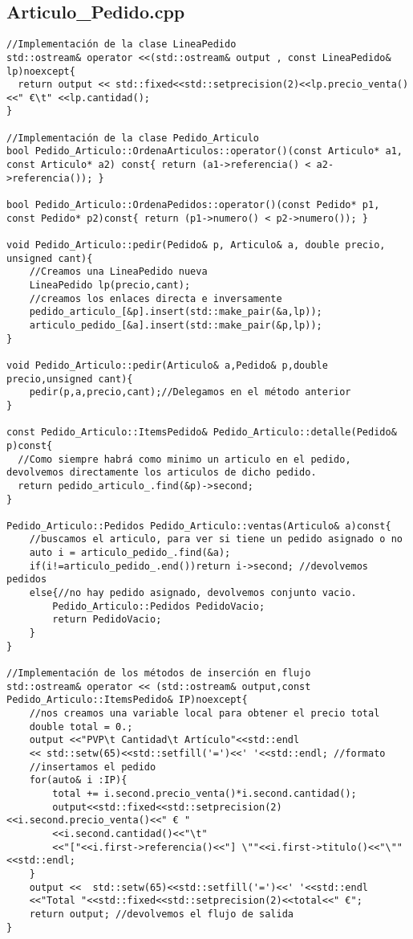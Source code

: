 \subsection{Articulo\_Pedido.cpp}
\begin{verbatim}
//Implementación de la clase LineaPedido
std::ostream& operator <<(std::ostream& output , const LineaPedido& lp)noexcept{
  return output << std::fixed<<std::setprecision(2)<<lp.precio_venta()<<" €\t" <<lp.cantidad();
}

//Implementación de la clase Pedido_Articulo
bool Pedido_Articulo::OrdenaArticulos::operator()(const Articulo* a1, const Articulo* a2) const{ return (a1->referencia() < a2->referencia()); }  

bool Pedido_Articulo::OrdenaPedidos::operator()(const Pedido* p1, const Pedido* p2)const{ return (p1->numero() < p2->numero()); }

void Pedido_Articulo::pedir(Pedido& p, Articulo& a, double precio, unsigned cant){
    //Creamos una LineaPedido nueva
    LineaPedido lp(precio,cant);
    //creamos los enlaces directa e inversamente
    pedido_articulo_[&p].insert(std::make_pair(&a,lp));
    articulo_pedido_[&a].insert(std::make_pair(&p,lp));
}

void Pedido_Articulo::pedir(Articulo& a,Pedido& p,double precio,unsigned cant){
    pedir(p,a,precio,cant);//Delegamos en el método anterior
}

const Pedido_Articulo::ItemsPedido& Pedido_Articulo::detalle(Pedido& p)const{
  //Como siempre habrá como minimo un articulo en el pedido, devolvemos directamente los articulos de dicho pedido.
  return pedido_articulo_.find(&p)->second;
}

Pedido_Articulo::Pedidos Pedido_Articulo::ventas(Articulo& a)const{
    //buscamos el articulo, para ver si tiene un pedido asignado o no
    auto i = articulo_pedido_.find(&a);
    if(i!=articulo_pedido_.end())return i->second; //devolvemos pedidos
    else{//no hay pedido asignado, devolvemos conjunto vacio.
        Pedido_Articulo::Pedidos PedidoVacio;
        return PedidoVacio;
    }
}

//Implementación de los métodos de inserción en flujo
std::ostream& operator << (std::ostream& output,const Pedido_Articulo::ItemsPedido& IP)noexcept{
    //nos creamos una variable local para obtener el precio total
    double total = 0.;
    output <<"PVP\t Cantidad\t Artículo"<<std::endl
    << std::setw(65)<<std::setfill('=')<<' '<<std::endl; //formato
    //insertamos el pedido
    for(auto& i :IP){
        total += i.second.precio_venta()*i.second.cantidad();
        output<<std::fixed<<std::setprecision(2)<<i.second.precio_venta()<<" € "
        <<i.second.cantidad()<<"\t"
        <<"["<<i.first->referencia()<<"] \""<<i.first->titulo()<<"\""<<std::endl;
    }
    output <<  std::setw(65)<<std::setfill('=')<<' '<<std::endl
    <<"Total "<<std::fixed<<std::setprecision(2)<<total<<" €";
    return output; //devolvemos el flujo de salida
}




\end{verbatim}
